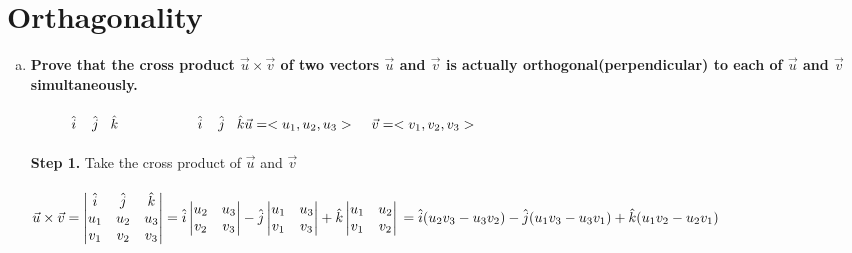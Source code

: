 \documentclass{article}
\begin{document}
\section{Orthagonality}
\begin{enumerate}[a.]
	\item \textbf{Prove that the cross product $\vec{u} \times \vec{v}$ of two vectors $\vec{u}$ and $\vec{v}$ is actually orthogonal(perpendicular) to each of $\vec{u}$ and $\vec{v}$ simultaneously.}\\
	      \\
	      
	      $\hspace{1cm}\hat{i}\hspace{.4cm}\hat{j}\hspace{.3cm}\hat{k}\hspace{2cm}\hat{i}\hspace{.4cm}\hat{j}\hspace{.3cm}\hat{k}\\\vec{u} = <u_{1},u_{2},u_{3}>\hspace{.4cm}\vec{v} = <v_{1},v_{2},v_{3}>$\\
	      \\
	      \textbf{Step 1.} Take the cross product of $\vec{u}$ and $\vec{v}$\\
	      \\
	      $\vec{u}\times\vec{v}=\begin{vmatrix}
	      \hat{i}&\hat{j}&\hat{k}\\
	      u_{1}&u_{2}&u_{3}\\
	      v_{1}&v_{2}&v_{3}\\
	\end{vmatrix}=\hat{i}
	\begin{vmatrix}
		u_{2} & u_{3} \\
		v_{2} & v_{3} \\
	\end{vmatrix}-\hat{j}\begin{vmatrix}
	u_{1}&u_{3}\\
	v_{1}&v_{3}\\
	\end{vmatrix}+\hat{k}\begin{vmatrix}
	u_{1}&u_{2}\\
	v_{1}&v_{2}\\
	\end{vmatrix}\\
	=\hat{i}(u_{2}v_{3}-u_{3}v_{2})-\hat{j}(u_{1}v_{3}-u_{3}v_{1})+\hat{k}(u_{1}v_{2}-u_{2}v_{1})$\\

\end{enumerate}
\end{document}
